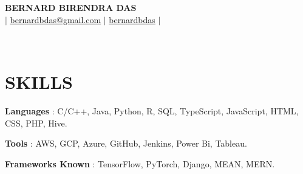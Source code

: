 \documentclass[letterpaper,10pt]{article}
\begin{document}
\begin{center}
    \textbf{\Large\scshape BERNARD BIRENDRA DAS} \\ \vspace{2pt}
    \small {} $|$ 
    \faEnvelope \hspace{2pt} \href{mailto:bernardbdas@gmail.com}{\color{black} \underline {bernardbdas@gmail.com}} $|$ 
    \faLinkedin \hspace{2pt}\href{www.linkedin.com/in/bernardbdas/} {\color{black} \underline{bernardbdas}} \hspace{1pt} $|$ 
    \address{  Kolkata, West Bengal}\\
\end{center}
\vspace{-15pt}

\section{SKILLS}
\begin{itemize}[leftmargin=0in, label={}]
\vspace{2pt}
    \small{
    \item {
        \textbf{Languages} {: C/C++, Java, Python, R, SQL, TypeScript, JavaScript, HTML, CSS, PHP, Hive.} \vspace{2pt} \\}
    \item {
        \textbf{Tools} {: AWS, GCP, Azure, GitHub, Jenkins, Power Bi, Tableau.}\vspace{2pt} \\}
    \item {
        \textbf{Frameworks Known} {: TensorFlow, PyTorch, Django, MEAN, MERN.}\vspace{2pt} \\}
    }
\end{itemize} 

\end{document}
